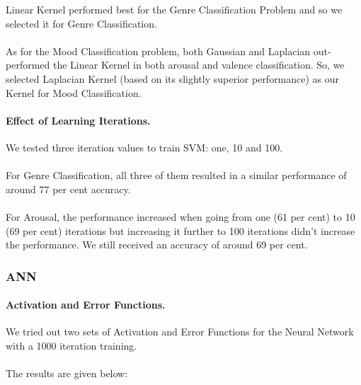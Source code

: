 Linear Kernel performed best for the Genre Classification Problem and so we selected it for Genre Classification.\\
\\
As for the Mood Classification problem, both Gaussian and Laplacian out-performed the Linear Kernel in both arousal and valence classification. So, we selected Laplacian Kernel (based on its slightly superior performance) as our Kernel for Mood Classification.

\paragraph{Effect of Learning Iterations.}
We tested three iteration values to train SVM: one, 10 and 100.\\ 
\\
For Genre Classification, all three of them resulted in a similar performance of around 77 per cent accuracy.\\ 
\\
For Arousal, the performance increased when going from one (61 per cent) to 10 (69 per cent) iterations but increasing it further to 100 iterations didn’t increase the performance. We still received an accuracy of around 69 per cent.

\subsubsection{ANN}
\paragraph{Activation and Error Functions.}
We tried out two sets of Activation and Error Functions for the Neural Network with a 1000 iteration training.\\
\\
The results are given below:\\

